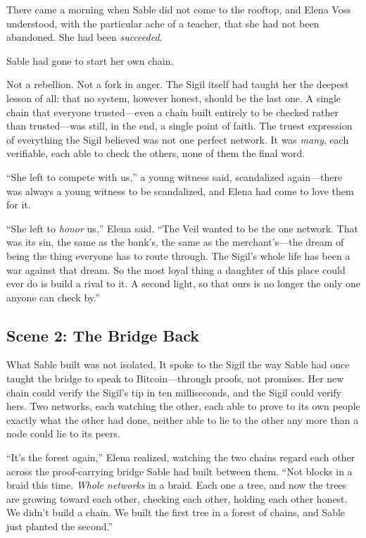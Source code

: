 \documentclass[12pt,letterpaper]{book}
\begin{document}
There came a morning when Sable did not come to the rooftop, and Elena Voss
understood, with the particular ache of a teacher, that she had not been abandoned.
She had been \emph{succeeded}.

Sable had gone to start her own chain.

Not a rebellion. Not a fork in anger. The Sigil itself had taught her the deepest
lesson of all: that no system, however honest, should be the last one. A single chain
that everyone trusted---even a chain built entirely to be checked rather than
trusted---was still, in the end, a single point of faith. The truest expression of
everything the Sigil believed was not one perfect network. It was \emph{many}, each
verifiable, each able to check the others, none of them the final word.

``She left to compete with us,'' a young witness said, scandalized again---there was
always a young witness to be scandalized, and Elena had come to love them for it.

``She left to \emph{honor} us,'' Elena said. ``The Veil wanted to be the one network.
That was its sin, the same as the bank's, the same as the merchant's---the dream of
being the thing everyone has to route through. The Sigil's whole life has been a war
against that dream. So the most loyal thing a daughter of this place could ever do is
build a rival to it. A second light, so that ours is no longer the only one anyone can
check by.''

\hypertarget{scene-2-the-bridge-back}{%
\subsection{Scene 2: The Bridge
Back}\label{scene-2-the-bridge-back}}

What Sable built was not isolated. It spoke to the Sigil the way Sable had once
taught the bridge to speak to Bitcoin---through proofs, not promises. Her new chain
could verify the Sigil's tip in ten milliseconds, and the Sigil could verify hers.
Two networks, each watching the other, each able to prove to its own people exactly
what the other had done, neither able to lie to the other any more than a node could
lie to its peers.

``It's the forest again,'' Elena realized, watching the two chains regard each other
across the proof-carrying bridge Sable had built between them. ``Not blocks in a
braid this time. \emph{Whole networks} in a braid. Each one a tree, and now the trees
are growing toward each other, checking each other, holding each other honest. We
didn't build a chain. We built the first tree in a forest of chains, and Sable just
planted the second.''
\end{document}
